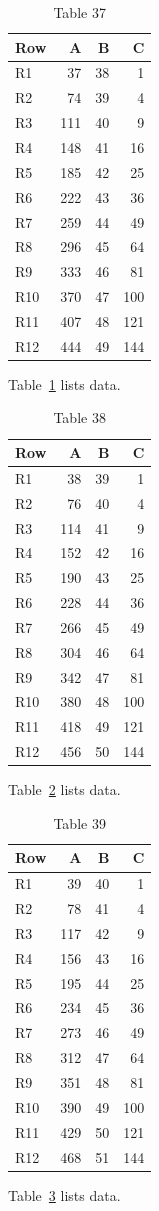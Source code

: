 \documentclass[10pt]{article}
\begin{document}
\begin{table}[ht]\centering\caption{Table 37}\label{tab:37}\begin{tabular}{lrrr}\toprule Row&A&B&C\\\midrule
R1&37&38&1\\
R2&74&39&4\\
R3&111&40&9\\
R4&148&41&16\\
R5&185&42&25\\
R6&222&43&36\\
R7&259&44&49\\
R8&296&45&64\\
R9&333&46&81\\
R10&370&47&100\\
R11&407&48&121\\
R12&444&49&144\\
\bottomrule\end{tabular}\end{table} Table~\ref{tab:37} lists data.
\begin{table}[ht]\centering\caption{Table 38}\label{tab:38}\begin{tabular}{lrrr}\toprule Row&A&B&C\\\midrule
R1&38&39&1\\
R2&76&40&4\\
R3&114&41&9\\
R4&152&42&16\\
R5&190&43&25\\
R6&228&44&36\\
R7&266&45&49\\
R8&304&46&64\\
R9&342&47&81\\
R10&380&48&100\\
R11&418&49&121\\
R12&456&50&144\\
\bottomrule\end{tabular}\end{table} Table~\ref{tab:38} lists data.
\begin{table}[ht]\centering\caption{Table 39}\label{tab:39}\begin{tabular}{lrrr}\toprule Row&A&B&C\\\midrule
R1&39&40&1\\
R2&78&41&4\\
R3&117&42&9\\
R4&156&43&16\\
R5&195&44&25\\
R6&234&45&36\\
R7&273&46&49\\
R8&312&47&64\\
R9&351&48&81\\
R10&390&49&100\\
R11&429&50&121\\
R12&468&51&144\\
\bottomrule\end{tabular}\end{table} Table~\ref{tab:39} lists data.
\end{document}
